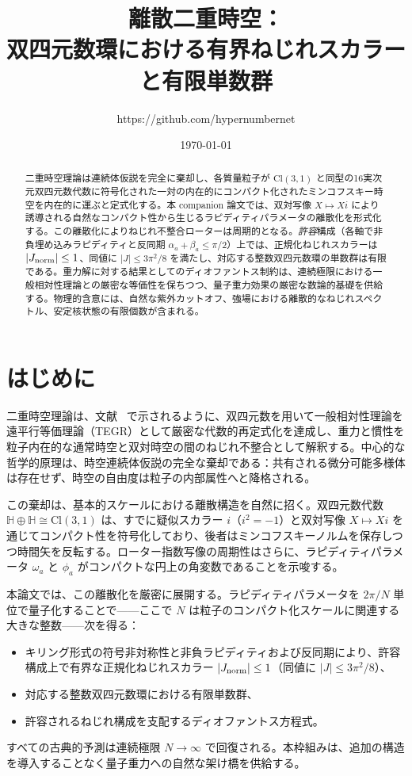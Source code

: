 \documentclass[dvipdfmx,11pt,a4paper]{article}
\title{離散二重時空：\\
双四元数環における有界ねじれスカラーと有限単数群}
\author{https://github.com/hypernumbernet}
\date{\today}
\newcommand{\Jnorm}{J_{\rm norm}}
\begin{document}
\maketitle

\begin{abstract}
二重時空理論は連続体仮説を完全に棄却し、各質量粒子が $\mathrm{Cl}(3,1)$ と同型の16実次元双四元数代数に符号化された一対の内在的にコンパクト化されたミンコフスキー時空を内在的に運ぶと定式化する。本 companion 論文では、双対写像 $X \mapsto Xi$ により誘導される自然なコンパクト性から生じるラピディティパラメータの離散化を形式化する。この離散化によりねじれ不整合ローターは周期的となる。\emph{許容}構成（各軸で非負埋め込みラピディティと反同期 $\alpha_a+\beta_a\leq\pi/2$）上では、正規化ねじれスカラーは $|\Jnorm|\leq 1$、同値に $|J|\leq 3\pi^2/8$ を満たし、対応する整数双四元数環の単数群は有限である。重力解に対する結果としてのディオファントス制約は、連続極限における一般相対性理論との厳密な等価性を保ちつつ、量子重力効果の厳密な数論的基礎を供給する。物理的含意には、自然な紫外カットオフ、強場における離散的なねじれスペクトル、安定核状態の有限個数が含まれる。
\end{abstract}

\section{はじめに}
\label{sec:intro}

二重時空理論は、文献~\cite{main-paper} で示されるように、双四元数を用いて一般相対性理論を遠平行等価理論（TEGR）として厳密な代数的再定式化を達成し、重力と慣性を粒子内在的な通常時空と双対時空の間のねじれ不整合として解釈する。中心的な哲学的原理は、時空連続体仮説の完全な棄却である：共有される微分可能多様体は存在せず、時空の自由度は粒子の内部属性へと降格される。

この棄却は、基本的スケールにおける離散構造を自然に招く。双四元数代数 $\mathbb{H} \oplus \mathbb{H} \cong \mathrm{Cl}(3,1)$ は、すでに疑似スカラー $i$（$i^2 = -1$）と双対写像 $X \mapsto Xi$ を通じてコンパクト性を符号化しており、後者はミンコフスキーノルムを保存しつつ時間矢を反転する。ローター指数写像の周期性はさらに、ラピディティパラメータ $\omega_a$ と $\phi_a$ がコンパクトな円上の角変数であることを示唆する。

本論文では、この離散化を厳密に展開する。ラピディティパラメータを $2\pi/N$ 単位で量子化することで——ここで $N$ は粒子のコンパクト化スケールに関連する大きな整数——次を得る：
\begin{itemize}
  \item キリング形式の符号非対称性と非負ラピディティおよび反同期により、許容構成上で有界な正規化ねじれスカラー $|\Jnorm| \leq 1$（同値に $|J| \leq 3\pi^2/8$）、
  \item 対応する整数双四元数環における有限単数群、
  \item 許容されるねじれ構成を支配するディオファントス方程式。
\end{itemize}
すべての古典的予測は連続極限 $N \to \infty$ で回復される。本枠組みは、追加の構造を導入することなく量子重力への自然な架け橋を供給する。
\end{document}
